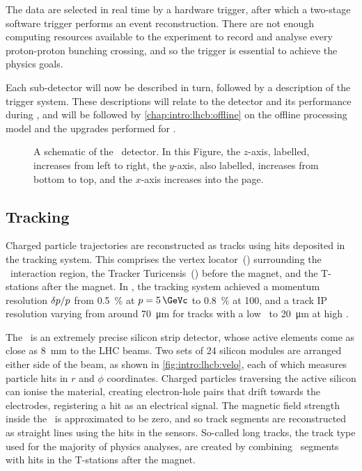 The data are selected in real time by a hardware trigger, after which a 
two-stage software trigger performs an event reconstruction.
There are not enough computing resources available to the experiment to record 
and analyse every proton-proton bunching crossing, and so the trigger is 
essential to achieve the physics goals.

Each sub-detector will now be described in turn, followed by a description of 
the trigger system.
These descriptions will relate to the detector and its performance during 
\runone, and will be followed by \cref{chap:intro:lhcb:offline} on the offline 
processing model and the upgrades performed for \runtwo.

\begin{figure}
  \centering
  
  \caption{%
    A schematic of the \lhcb\ detector.
    In this Figure, the $z$-axis, labelled, increases from left to right, the 
    $y$-axis, also labelled, increases from bottom to top, and the $x$-axis 
    increases into the page.
  }
  \label{fig:intro:lhcb:detector}
\end{figure}

\subsection{Tracking}
\label{chap:intro:lhcb:detector:tracking}

Charged particle trajectories are reconstructed as tracks using hits deposited 
in the tracking system.
This comprises the vertex locator~(\velo) surrounding the \pp\ interaction 
region, the Tracker Turicensis~(\ttracker) before the magnet, and the 
T-stations after the magnet.
In \runone, the tracking system achieved a momentum resolution 
$\delta{\ensuremath{p}}/p$ from \SI{0.5}{\percent} at $\ptot = \SI{5}{\GeVc}$ to 
\SI{0.8}{\percent} at \SI{100}{\GeVc}, and a track \acl{IP} resolution varying 
from around \SI{70}{\micro\metre} for tracks with a low \pT\ to 
\SI{20}{\micro\metre} at high \pT.

The \velo\ is an extremely precise silicon strip detector, whose active 
elements come as close as \SI{8}{\milli\metre} to the \ac{LHC} beams.
Two sets of 24 silicon modules are arranged either side of the beam, as shown 
in \cref{fig:intro:lhcb:velo}, each of which measures particle hits in $r$ and 
$\phi$ coordinates.
Charged particles traversing the active silicon can ionise the material, 
creating electron-hole pairs that drift towards the electrodes, registering a 
hit as an electrical signal.
The magnetic field strength inside the \velo\ is approximated to be zero, and 
so track segments are reconstructed as straight lines using the hits in the 
sensors.
So-called long tracks, the track type used for the majority of physics 
analyses, are created by combining \velo\ segments with hits in the T-stations 
after the magnet.

